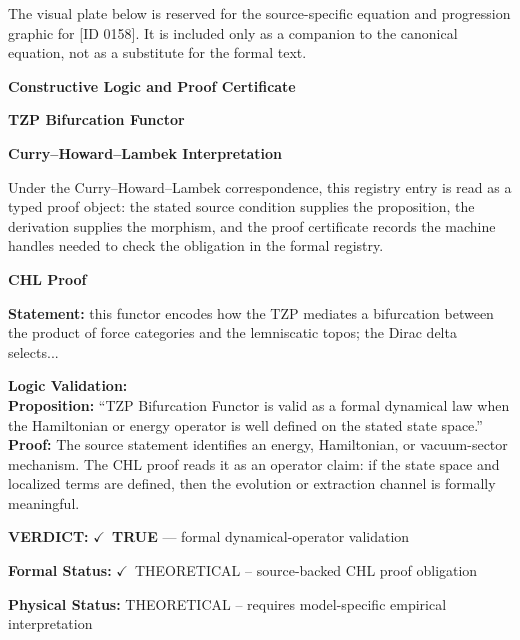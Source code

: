 \begingroup\footnotesize\sloppy
The visual plate below is reserved for the source-specific equation and progression graphic for [ID 0158]. It is included only as a companion to the canonical equation, not as a substitute for the formal text.
\par\endgroup
\ifTZPDarkEdition
{}
\fi

\clearpage
\begingroup\tzpsupportsetup
\noindent\textbf{\fontsize{10.8pt}{12.8pt}\selectfont [ID 0158] Constructive Logic and Proof Certificate}\par
\noindent\textbf{\fontsize{10pt}{12pt}\selectfont TZP Bifurcation Functor}\par
\vspace{0.45em}
\begingroup
\footnotesize
\setlength{\parskip}{0.22em}
\setlength{\parindent}{0pt}
\noindent\textbf{Curry--Howard--Lambek Interpretation}\par
Under the Curry--Howard--Lambek correspondence, this registry entry is read as a typed proof
object: the stated source condition supplies the proposition, the derivation supplies the
morphism, and the proof certificate records the machine handles needed to check the obligation
in the formal registry.

\vspace{0.45em}
\noindent\textbf{CHL Proof}\par
\textbf{Statement:} this functor encodes how the TZP mediates a bifurcation between the product of force
categories and the lemniscatic topos; the Dirac delta selects...

\textbf{Logic Validation:}\\
\textbf{Proposition:} ``TZP Bifurcation Functor is valid as a formal dynamical law when the Hamiltonian or
energy operator is well defined on the stated state space.''\\
\textbf{Proof:} The source statement identifies an energy, Hamiltonian, or vacuum-sector mechanism. The
CHL proof reads it as an operator claim: if the state space and localized terms are
defined, then the evolution or extraction channel is formally meaningful.

\textbf{VERDICT:} \ensuremath{\checkmark}\ \textbf{TRUE} --- formal dynamical-operator validation

\textbf{Formal Status:} \ensuremath{\checkmark}\ THEORETICAL -- source-backed CHL proof obligation

\textbf{Physical Status:} THEORETICAL -- requires model-specific empirical interpretation
\par\vspace{0.45em}
\par
\ifTZPDarkEdition
{}
\fi
\endgroup
\endgroup
